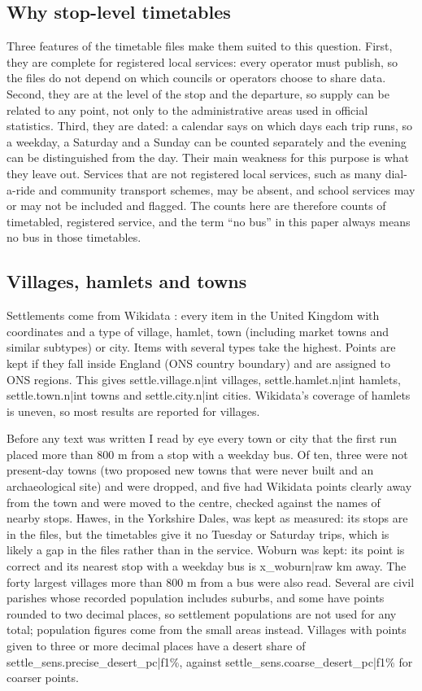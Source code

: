 \documentclass[11pt,a4paper]{article}
\begin{document}
\subsection{Why stop-level timetables}
Three features of the timetable files make them suited to this question. First, they are complete for registered local services: every operator must publish, so the files do not depend on which councils or operators choose to share data. Second, they are at the level of the stop and the departure, so supply can be related to any point, not only to the administrative areas used in official statistics. Third, they are dated: a calendar says on which days each trip runs, so a weekday, a Saturday and a Sunday can be counted separately and the evening can be distinguished from the day. Their main weakness for this purpose is what they leave out. Services that are not registered local services, such as many dial-a-ride and community transport schemes, may be absent, and school services may or may not be included and flagged. The counts here are therefore counts of timetabled, registered service, and the term ``no bus'' in this paper always means no bus in those timetables.

\subsection{Villages, hamlets and towns}
Settlements come from Wikidata \citep{vrandecic2014}: every item in the United Kingdom with coordinates and a type of village, hamlet, town (including market towns and similar subtypes) or city. Items with several types take the highest. Points are kept if they fall inside England (ONS country boundary) and are assigned to ONS regions. This gives {{settle.village.n|int}} villages, {{settle.hamlet.n|int}} hamlets, {{settle.town.n|int}} towns and {{settle.city.n|int}} cities. Wikidata's coverage of hamlets is uneven, so most results are reported for villages.

Before any text was written I read by eye every town or city that the first run placed more than 800 m from a stop with a weekday bus. Of ten, three were not present-day towns (two proposed new towns that were never built and an archaeological site) and were dropped, and five had Wikidata points clearly away from the town and were moved to the centre, checked against the names of nearby stops. Hawes, in the Yorkshire Dales, was kept as measured: its stops are in the files, but the timetables give it no Tuesday or Saturday trips, which is likely a gap in the files rather than in the service. Woburn was kept: its point is correct and its nearest stop with a weekday bus is {{x_woburn|raw}} km away. The forty largest villages more than 800 m from a bus were also read. Several are civil parishes whose recorded population includes suburbs, and some have points rounded to two decimal places, so settlement populations are not used for any total; population figures come from the small areas instead. Villages with points given to three or more decimal places have a desert share of {{settle_sens.precise_desert_pc|f1}}\%, against {{settle_sens.coarse_desert_pc|f1}}\% for coarser points.
\end{document}
